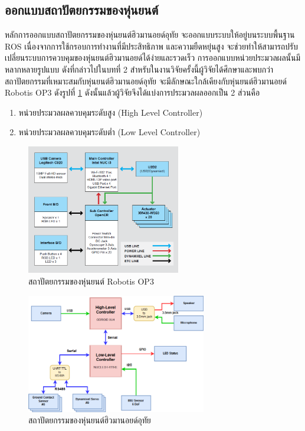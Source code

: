 \subsection{ออกแบบสถาปัตยกรรมของหุ่นยนต์}
หลักการออกแบบสถาปัตยกรรมของหุ่นยนต์ฮิวมานอยด์อุทัย จะออกแบบระบบให้อยู่บนระบบพื้นฐาน ROS
เนื่องจากการใช้กรอบการทำงานที่มีประสิทธิภาพ และความยืดหยุ่นสูง จะช่วยทำให้สามารถปรับเปลี่ยนระบบการควบคุมของหุ่นยนต์ฮิวมานอยด์ได้ง่ายและรวดเร็ว
การออกแบบหน่วยประมวลผลนั้นมีหลากหลายรูปแบบ ดังที่กล่าวไปในบทที่ 2 สำหรับในงานวิจัยครั้งนี้ผู้วิจัยได้ศึกษาและพบกว่าสถาปัตยกรรมที่เหมาะสมกับหุ่นยนต์ฮิวมานอยด์อุทัย
จะมีลักษณะใกล้เคียงกับหุ่นยนต์ฮิวมานอยด์ Robotis OP3 ดังรูปที่ \ref{fig:op3_argitec} ดังนั้นแล้วผู้วิจัยจึงได้แบ่งการประมวลผลออกเป็น 2 ส่วนคือ
\begin{enumerate}[label=\arabic*, leftmargin=1.5cm]\setlength\itemsep{-0.25em}
	\item หน่วยประมวลผลควบคุมระดับสูง (High Level Controller)
	\item หน่วยประมวลผลควบคุมระดับต่ำ (Low Level Controller)
\end{enumerate}
\begin{figure}[!ht]
	\centering
	\includegraphics[width=0.6\textwidth]{chapter3/images/op3_029.png}
	\caption{สถาปัตยกรรมของหุ่นยนต์ Robotis OP3}
	\label{fig:op3_argitec}
\end{figure}
\begin{figure}[!ht]
	\centering
	\includegraphics[width=0.7\textwidth]{chapter3/images/uthai_argitec.png}
	\caption{สถาปัตยกรรมของหุ่นยนต์ฮิวมานอยด์อุทัย}
	\label{fig:uthai_argitec}
\end{figure}

